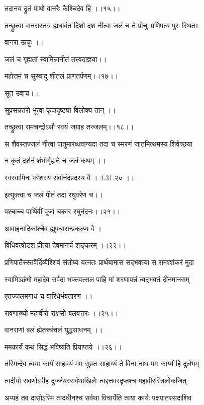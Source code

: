तदानय द्रुतं पाथो वानरैः कैश्चिदेव हि ।।१५।।


\twolineshloka
{तच्छ्रुत्वा वानरास्तत्र ह्यधावंत दिशो दश} 
{नीत्वा जलं च ते प्रोचुः प्रणिपत्य पुरः स्थिताः} %

वानरा ऊचुः ।।

जलं च गृह्यतां स्वामिन्नानीतं तत्त्वदाज्ञया।।

महोत्तमं च सुस्वादु शीतलं प्राणतर्पणम्।।१७।।

सूत उवाच।।

सुप्रसन्नतरो भूत्वा कृपादृष्ट्या विलोक्य तान् ।।

तच्छ्रुत्वा रामचन्द्रोऽसौ स्वयं जग्राह तज्जलम्।।१८।।

\twolineshloka
{स शैवस्तज्जलं नीत्वा पातुमारब्धवान्यदा} 
{तदा च स्मरणं जातमित्थमस्य शिवेच्छया} %

न कृतं दर्शनं शंभोर्गृह्यते च जलं कथम् ।।

स्वस्वामिनः परेशस्य सर्वानंदप्रदस्य वै । 4.31.२० ।।

इत्युक्त्वा च जलं पीतं तदा रघुवरेण च।।

पश्चाच्च पार्थिवीं पूजां चकार रघुनंदनः।।२१।।

आवाहनादिकांश्चैव ह्युपचारान्प्रकल्प्य वै ।

विधिवत्षोडश प्रीत्या देवमानर्च शङ्करम् ।।२२।।

\twolineshloka
{प्रणिपातैस्स्तवैर्दिव्यैश्शिवं संतोष्य यत्नतः}
{प्रार्थयामास सद्भक्त्या स रामश्शंकरं मुदा} %


\twolineshloka
{स्वामिञ्छंभो महादेव सर्वदा भक्तवत्सल} 
{पाहि मां शरणापन्नं त्वद्भक्तं दीनमानसम्} %

एतज्जलमगाधं च वारिधेर्भवतारण ।।

रावणाख्यो महावीरो राक्षसो बलवत्तरः ।।२५।।

वानराणां बलं ह्येतच्चंचलं युद्धसाधनम् ।।

ममकार्यं कथं सिद्धं भविष्यति प्रियाप्तये ।।२६।।

\twolineshloka
{तस्मिन्देव त्वया कार्यं साहाय्यं मम सुव्रत} 
{साहाय्यं ते विना नाथ मम कार्य्यं हि दुर्लभम्} %

\twolineshloka
{त्वदीयो रावणोऽपीह दुर्ज्जयस्सर्वथाखिलैः} 
{त्वद्दत्तवरदृप्तश्च महावीरस्त्रिलोकजित्} %

\twolineshloka
{अप्यहं तव दासोऽस्मि त्वदधीनश्च सर्वथा} 
{विचार्येति त्वया कार्यः पक्षपातस्सदाशिव} %


